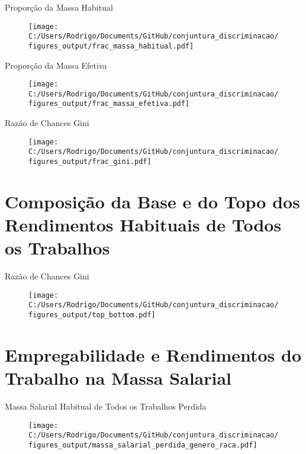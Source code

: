 \documentclass[10pt, xcolor=x11names,compress]{beamer}
\begin{document}
	\begin{frame}{Proporção da Massa Habitual}
		\begin{figure}
			\centering
			\texttt{[image: C:/Users/Rodrigo/Documents/GitHub/conjuntura\_discriminacao/figures\_output/frac\_massa\_habitual.pdf]}
		\end{figure}
	\end{frame}
	
	\begin{frame}{Proporção da Massa Efetiva}
		\begin{figure}
			\centering
			\texttt{[image: C:/Users/Rodrigo/Documents/GitHub/conjuntura\_discriminacao/figures\_output/frac\_massa\_efetiva.pdf]}
		\end{figure}
	\end{frame}
	
	\begin{frame}{Razão de Chances Gini}
		\begin{figure}
			\centering
			\texttt{[image: C:/Users/Rodrigo/Documents/GitHub/conjuntura\_discriminacao/figures\_output/frac\_gini.pdf]}
		\end{figure}
	\end{frame}
	
	\section{Composição da Base e do Topo dos Rendimentos Habituais de Todos os Trabalhos}
	\begin{frame}{Razão de Chances Gini}
		\begin{figure}
			\centering
			\texttt{[image: C:/Users/Rodrigo/Documents/GitHub/conjuntura\_discriminacao/figures\_output/top\_bottom.pdf]}
		\end{figure}
	\end{frame}
	
	
	\section{Empregabilidade e Rendimentos do Trabalho na Massa Salarial} 
	\begin{frame}{Massa Salarial Habitual de Todos os Trabalhos Perdida}
		\begin{figure}
			\centering
			\texttt{[image: C:/Users/Rodrigo/Documents/GitHub/conjuntura\_discriminacao/figures\_output/massa\_salarial\_perdida\_genero\_raca.pdf]}
		\end{figure}
	\end{frame}
	
\end{document}
